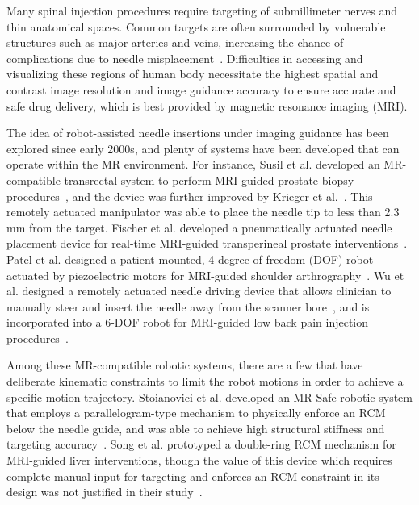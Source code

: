 Many spinal injection procedures require targeting of submillimeter nerves and thin anatomical spaces. Common targets are often surrounded by vulnerable structures such as major arteries and veins, increasing the chance of complications due to needle misplacement~\parencite{bogdukComplicationsSpinalDiagnostic2008}. Difficulties in accessing and visualizing these regions of human body necessitate the highest spatial and contrast image resolution and image guidance accuracy to ensure accurate and safe drug delivery, which is best provided by magnetic resonance imaging (MRI).

The idea of robot-assisted needle insertions under imaging guidance has been explored since early 2000s, and plenty of systems have been developed that can operate within the MR environment. For instance, Susil et al. developed an MR-compatible transrectal system to perform MRI-guided prostate biopsy procedures~\parencite{susilSystemMRImage2003,susilSystemProstateBrachytherapy2004}, and the device was further improved by Krieger et al.~\parencite{kriegerDesignNovelMRI2005}. This remotely actuated manipulator was able to place the needle tip to less than 2.3 mm from the target. Fischer et al. developed a pneumatically actuated needle placement device for real-time MRI-guided  transperineal prostate interventions~\parencite{fischerMRICompatiblePneumaticRobot2008}. Patel et al. designed a patient-mounted, 4 degree-of-freedom (DOF) robot actuated by piezoelectric motors for MRI-guided shoulder arthrography~\parencite{patelRoboticSystemMRIguided2018}. Wu et al. designed a remotely actuated needle driving device that allows clinician to manually steer and insert the needle away from the scanner bore~\parencite{wuRemotelyActuatedNeedle2019}, and is incorporated into a 6-DOF robot for MRI-guided low back pain injection procedures~\parencite{liFullyActuatedBodyMounted2020a}.

Among these MR-compatible robotic systems, there are a few that have deliberate kinematic constraints to limit the robot motions in order to achieve a specific motion trajectory. Stoianovici et al. developed an MR-Safe robotic system that employs a parallelogram-type mechanism to physically enforce an RCM below the needle guide, and was able to achieve high structural stiffness and targeting accuracy~\parencite{stoianoviciMultiImagerCompatibleMR2018}. Song et al. prototyped a double-ring RCM mechanism for MRI-guided liver interventions, though the value of this device which requires complete manual input for targeting and enforces an RCM constraint in its design was not justified in their study~\parencite{songDesignEvaluationDouble2013}.

